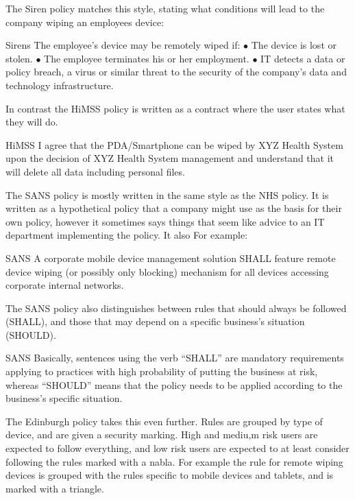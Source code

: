 \documentclass[thesis.tex]{subfiles}
\begin{document}
The Siren policy matches this style, stating what conditions will lead to the
company wiping an employees device:

\begin{policyrule}{Sirens}
The employee’s device may be remotely wiped if: $\bullet$ The device is lost or
stolen. $\bullet$ The employee terminates his or her employment. $\bullet$ IT
detects a data or policy breach, a virus or similar threat to the security of
the company’s data and technology infrastructure.
\end{policyrule}

In contrast the \ac{HiMSS} policy is written as a contract where the user states
what they will do.

\begin{policyrule}{HiMSS}
  I agree that the PDA/Smartphone can be wiped by XYZ Health System upon the
  decision of XYZ Health System management and understand that it will delete all
  data including personal files.
\end{policyrule}

The SANS policy is mostly written in the same style as the NHS policy.  It is
written as a hypothetical policy that a company might use as the basis for their
own policy, however it sometimes says things that seem like advice to an IT
department implementing the policy.  It also For example:

\begin{policyrule}{SANS}
   A corporate mobile device management solution SHALL feature remote device
   wiping (or possibly only blocking) mechanism for all devices accessing
   corporate internal networks.
\end{policyrule}

The SANS policy also distinguishes between rules that should always be followed (SHALL),
and those that may depend on a specific business's situation (SHOULD).

\begin{policyrule}{SANS}
  Basically, sentences using the verb ``SHALL'' are mandatory requirements
  applying to practices with high probability of putting the business at risk,
  whereas ``SHOULD'' means that the policy needs to be applied according to the
  business’s specific situation.
\end{policyrule}

The Edinburgh policy takes this even further. Rules are grouped by type of
device, and are given a security marking.  High and mediu,m risk users are
expected to follow everything, and low risk users are expected to at least
consider following the rules marked with a nabla.  For example the
rule for remote wiping devices is grouped with the rules specific to mobile
devices and tablets, and is marked with a triangle.
\end{document}
